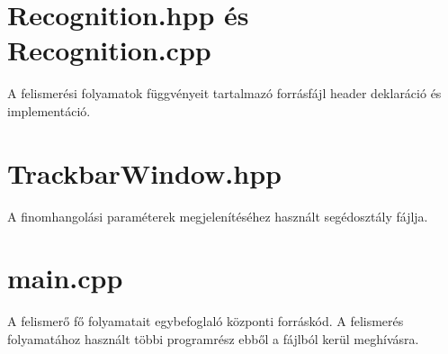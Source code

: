 \section{Recognition.hpp és Recognition.cpp}
A felismerési folyamatok függvényeit tartalmazó forrásfájl header deklaráció és implementáció.

\section{TrackbarWindow.hpp}
A finomhangolási paraméterek megjelenítéséhez használt segédosztály fájlja.

\section{main.cpp}
A felismerő fő folyamatait egybefoglaló központi forráskód. A felismerés folyamatához használt többi programrész ebből a fájlból kerül meghívásra.